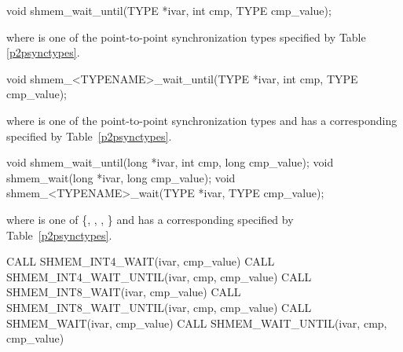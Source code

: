 
\begin{apidefinition}

\begin{C11synopsis}
void shmem_wait_until(TYPE *ivar, int cmp, TYPE cmp_value);
\end{C11synopsis}
where \TYPE{} is one of the point-to-point synchronization types specified by
Table \ref{p2psynctypes}.

\begin{Csynopsis}
void shmem_<TYPENAME>_wait_until(TYPE *ivar, int cmp, TYPE cmp_value);
\end{Csynopsis}
where \TYPE{} is one of the point-to-point synchronization types and has a
corresponding \TYPENAME{} specified by Table~\ref{p2psynctypes}.

\begin{DeprecateBlock}
\begin{CsynopsisCol}
void shmem_wait_until(long *ivar, int cmp, long cmp_value);
void shmem_wait(long *ivar, long cmp_value);
void shmem_<TYPENAME>_wait(TYPE *ivar, TYPE cmp_value);
\end{CsynopsisCol}
where \TYPE{} is one of \{, , ,
\} and has a corresponding \TYPENAME{} specified by
Table~\ref{p2psynctypes}.
\end{DeprecateBlock}

\begin{Fsynopsis}
CALL SHMEM_INT4_WAIT(ivar, cmp_value)
CALL SHMEM_INT4_WAIT_UNTIL(ivar, cmp, cmp_value)
CALL SHMEM_INT8_WAIT(ivar, cmp_value)
CALL SHMEM_INT8_WAIT_UNTIL(ivar, cmp, cmp_value)
CALL SHMEM_WAIT(ivar, cmp_value)
CALL SHMEM_WAIT_UNTIL(ivar, cmp, cmp_value)
\end{Fsynopsis}

\begin{apiarguments}



\end{apiarguments}
\end{apidefinition}
